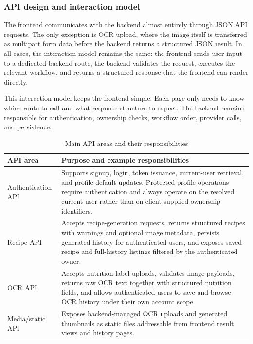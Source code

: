 \subsubsection{API design and interaction model}

The frontend communicates with the backend almost entirely through JSON
API requests. The only exception is OCR upload, where the image itself
is transferred as multipart form data before the backend returns a
structured JSON result. In all cases, the interaction model remains the
same: the frontend sends user input to a dedicated backend route, the
backend validates the request, executes the relevant workflow, and
returns a structured response that the frontend can render directly.

This interaction model keeps the frontend simple. Each page only needs
to know which route to call and what response structure to expect. The
backend remains responsible for authentication, ownership checks,
workflow order, provider calls, and persistence.

\begin{table}[H]
	\centering
	\scriptsize
	\begin{tabular}{|p{2.8cm}|p{11.1cm}|}
		\hline
		\textbf{API area} & \textbf{Purpose and example responsibilities} \\
		\hline
		Authentication API & Supports signup, login, token issuance, current-user retrieval, and profile-default updates. Protected profile operations require authentication and always operate on the resolved current user rather than on client-supplied ownership identifiers. \\
		\hline
		Recipe API & Accepts recipe-generation requests, returns structured recipes with warnings and optional image metadata, persists generated history for authenticated users, and exposes saved-recipe and full-history listings filtered by the authenticated owner. \\
		\hline
		OCR API & Accepts nutrition-label uploads, validates image payloads, returns raw OCR text together with structured nutrition fields, and allows authenticated users to save and browse OCR history under their own account scope. \\
		\hline
		Media/static API & Exposes backend-managed OCR uploads and generated thumbnails as static files addressable from frontend result views and history pages. \\
		\hline
	\end{tabular}
	\caption{Main API areas and their responsibilities}
	\label{tab:api-areas}
\end{table}

